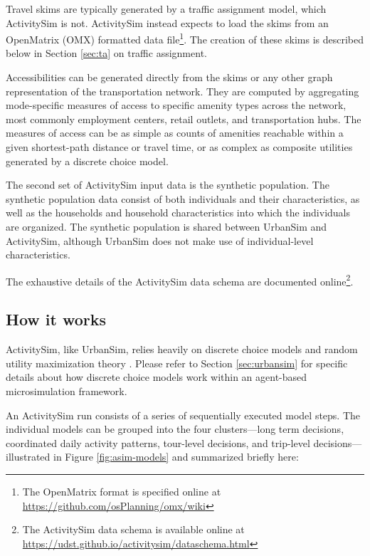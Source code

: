 Travel skims are typically generated by a traffic assignment model, which ActivitySim is not. ActivitySim instead expects to load the skims from an OpenMatrix (OMX) formatted data file\footnote{The OpenMatrix format is specified online at \url{https://github.com/osPlanning/omx/wiki}}. The creation of these skims is described below in Section \ref{sec:ta} on traffic assignment.

Accessibilities can be generated directly from the skims or any other graph representation of the transportation network. They are computed by aggregating mode-specific measures of access to specific amenity types across the network, most commonly employment centers, retail outlets, and transportation hubs. The measures of access can be as simple as counts of amenities reachable within a given shortest-path distance or travel time, or as complex as composite utilities generated by a discrete choice model. 

The second set of ActivitySim input data is the synthetic population. The synthetic population data consist of both individuals and their characteristics, as well as the households and household characteristics into which the individuals are organized. The synthetic population is shared between UrbanSim and ActivitySim, although UrbanSim does not make use of individual-level characteristics.

The exhaustive details of the ActivitySim data schema are documented online\footnote{The ActivitySim data schema is available online at \url{https://udst.github.io/activitysim/dataschema.html}}.

\subsection{How it works}

ActivitySim, like UrbanSim, relies heavily on discrete choice models and random utility maximization theory \citep{mcfadden-1974}. Please refer to Section \ref{sec:urbansim} for specific details about how discrete choice models work within an agent-based microsimulation framework.

An ActivitySim run consists of a series of sequentially executed model steps. The individual models can be grouped into the four clusters---long term decisions, coordinated daily activity patterns, tour-level decisions, and trip-level decisions---illustrated in Figure \ref{fig:asim-models} and summarized briefly here:

